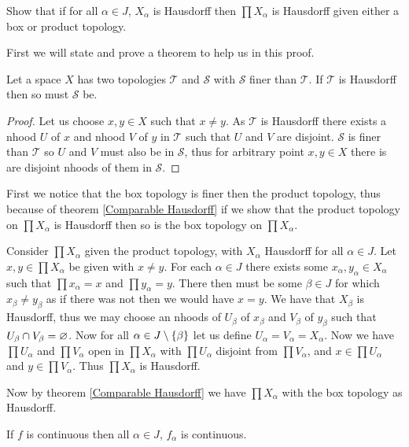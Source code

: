 \documentclass{article}
\begin{document}
 Show that if for all $\alpha\in J$, $X_\alpha$ is Hausdorff then $\prod X_\alpha$ is Hausdorff given either a box or product topology.


First we will state and prove a theorem to help us in this proof.

\begin{theorem} \label{Comparable Hausdorff}
	Let a space $X$ has two topologies $\mathscr T$ and $\mathscr S$ with $\mathscr S$ finer than $\mathscr T$. If $\mathscr T$ is Hausdorff then so must $\mathscr S$ be.
\end{theorem}

\begin{proof}
	Let us choose $x,y\in X$ such that $x\not=y$. As $\mathscr T$ is Hausdorff there exists a nhood $U$ of $x$ and nhood $V$ of $y$ in $\mathscr T$ such that $U$ and $V$ are disjoint. $\mathscr S$ is finer than $\mathscr T$ so $U$ and $V$ must also be in $\mathscr S$, thus for arbitrary point $x,y\in X$ there is are disjoint nhoods of them in $\mathscr S$.
\end{proof}

First we notice that the box topology is finer then the product topology, thus because of theorem \ref{Comparable Hausdorff} if we show that the product topology on $\prod X_\alpha$ is Hausdorff then so is the box topology on $\prod X_\alpha$.

Consider $\prod X_\alpha$ given the product topology, with $X_\alpha$ Hausdorff for all $\alpha \in J$. Let $x,y\in \prod X_\alpha$ be given with $x\not=y$. For each $\alpha\in J$ there exists some $x_\alpha,y_\alpha \in X_\alpha$ such that $\prod x_\alpha = x$ and $\prod y_\alpha = y$. There then must be some $\beta \in J$ for which $x_\beta \not= y_\beta$ as if there was not then we would have $x=y$. We have that $X_\beta$ is Hausdorff, thus we may choose an nhoods of $U_\beta$ of $x_\beta$ and $V_\beta$ of $y_\beta$ such that $U_\beta \cap V_\beta = \varnothing$. Now for all $\alpha \in J\setminus\left\{ {\beta} \right\}$ let us define $U_\alpha = V_\alpha = X_\alpha$. Now we have $\prod U_\alpha$ and $\prod V_\alpha$ open in $\prod X_\alpha$ with $\prod U_\alpha$ disjoint from $\prod V_\alpha$, and $x \in \prod U_\alpha$ and $y \in \prod V_\alpha$. Thus $\prod X_\alpha$ is Hausdorff.

Now by theorem \ref{Comparable Hausdorff} we have $\prod X_\alpha$ with the box topology as Hausdorff.

If $f$ is continuous then all $\alpha \in J$,  $f_\alpha$ is continuous.
\end{document}
